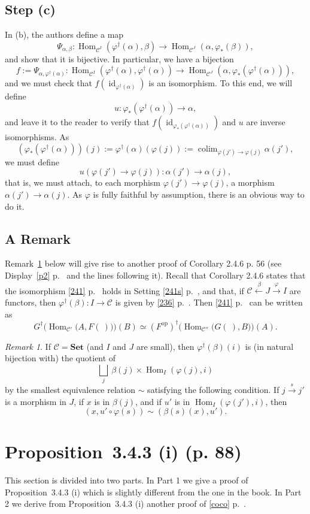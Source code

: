 \documentclass[12pt]{article}
\theoremstyle{remark}%
\newtheorem{rk}[thm]{Remark}%
\newcommand{\n}{\noindent}
\newcommand{\C}{\mathcal C}
\newcommand{\Set}{\textbf{Set}}
\newcommand{\p}{\varphi}
\newcommand{\xr}{\xrightarrow}
\newcommand{\be}{\begin{equation}}
\newcommand{\ee}{\end{equation}}
\newcommand{\pr}{Proposition}
\DeclareMathOperator*{\coli}{colim}
\DeclareMathOperator{\id}{id}
\DeclareMathOperator{\Hom}{Hom}
\DeclareMathOperator{\h}{Hom}
\DeclareMathOperator{\op}{op}
\begin{document}
\subsection{Step (c)}%
% 
In (b), the authors define a map 
% 
\be\label{e233i} 
%
\Psi_{\alpha,\beta}:
\Hom_{\C^I}(\varphi^\dagger(\alpha),\beta)\to
\Hom_{\C^J}(\alpha,\varphi_*(\beta)),
%
\ee 
% 
and show that it is bijective. In particular, we have a bijection 
$$
f:=\Psi_{\alpha,\varphi^\dagger(\alpha)}:
\Hom_{\C^I}(\varphi^\dagger(\alpha),\varphi^\dagger(\alpha))\to
\Hom_{\C^J}(\alpha,\varphi_*(\varphi^\dagger(\alpha))),
$$
and we must check that $f(\id_{\varphi^\dagger(\alpha)})$ is an isomorphism. To this end, we will define 
$$
u:\varphi_*(\varphi^\dagger(\alpha))\to\alpha,
$$
and leave it to the reader to verify that $f(\id_{\varphi_*(\varphi^\dagger(\alpha))})$ and $u$ are inverse isomorphisms. As 
$$ 
(\varphi_*(\varphi^\dagger(\alpha)))(j):=\varphi^\dagger(\alpha)(\varphi(j)):=\coli_{\varphi(j')\to\varphi(j)}\alpha(j'),
$$
we must define 
$$
u(\varphi(j')\to\varphi(j)):\alpha(j')\to\alpha(j),
$$
that is, we must attach, to each morphism $\varphi(j')\to\varphi(j)$, a morphism $\alpha(j')\to\alpha(j)$. As $\varphi$ is fully faithful by assumption, there is an obvious way to do it. 
% 
\subsection{A Remark}\label{s236}%
% 
Remark~\ref{r236} below will give rise to another proof of Corollary 2.4.6 p. 56 (see Display~\eqref{p2} p.~\pageref{p2} and the lines following it). Recall that Corollary 2.4.6 states that the isomorphism \eqref{241} p.~\pageref{241} holds in Setting \eqref{241s} p.~\pageref{241s}, and that, if $\C\xleftarrow{\,\beta}J\xrightarrow{\p}I$ are functors, then $\p^\dagger(\beta):I\to\C$ is given by \eqref{236} p.\n~\pageref{236}. Then \eqref{241} p.~\pageref{241} can be written as 
$$
G^\dagger\Big(\h_{\C'}\big(A,F(\ )\big)\Big)(B)\simeq
(F^{\op})^\dagger\Big(\h_{\C''}\big(G(\ ),B\big)\Big)(A).
$$ 
%
\begin{rk}\label{r236}
If $\C=\Set$ (and $I$ and $J$ are small), then $\p^\dagger(\beta)(i)$ is (in natural bijection with) the quotient of 
$$
\bigsqcup_j\ \beta(j)\times\h_I(\p(j),i) 
$$ 
by the smallest equivalence relation $\sim$ satisfying the following condition. If $j\xr s j'$ is a morphism in $J$, if $x$ is in $\beta(j)$, and if $u'$ is in $\h_I(\p(j'),i)$, then 
$$
(x,u'\circ\p(s))\sim(\beta(s)(x),u'). 
$$ 
\end{rk} 
% 
\section{\pr\ 3.4.3 (i) (p. 88)}%
%
This section is divided into two parts. In Part 1 we give a proof of \pr\ 3.4.3 (i) which is slightly different from the one in the book. In Part 2 we derive from \pr\ 3.4.3 (i) another proof of \eqref{coco} p.~\pageref{coco}. 
%
\end{document}
